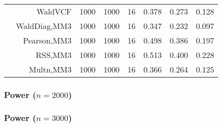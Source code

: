 \documentclass[
]{article}
\begin{document}
\begin{table}[H]
{\begin{tabular}[t]{lrrrrrrr}
\hspace{1em} & WaldVCF & 1000 & 1000 & 16 & 0.378 & 0.273 & 0.128\\

\hspace{1em} & WaldDiag,MM3 & 1000 & 1000 & 16 & 0.347 & 0.232 & 0.097\\

\hspace{1em} & Pearson,MM3 & 1000 & 1000 & 16 & 0.498 & 0.386 & 0.197\\

\hspace{1em} & RSS,MM3 & 1000 & 1000 & 16 & 0.513 & 0.400 & 0.228\\

\hspace{1em} & Multn,MM3 & 1000 & 1000 & 16 & 0.366 & 0.264 & 0.125\\
\bottomrule
\end{tabular}}
\endgroup{}
\end{table}

\hypertarget{power-n2000}{%
\subsubsection{\texorpdfstring{Power
(\(n=2000\))}{Power (n=2000)}}\label{power-n2000}}

\begin{table}[H]
\centering\begingroup\fontsize{7}{9}\selectfont

\endgroup{}
\end{table}

\hypertarget{power-n3000}{%
\subsubsection{\texorpdfstring{Power
(\(n=3000\))}{Power (n=3000)}}\label{power-n3000}}

\begin{table}[H]
\centering\begingroup\fontsize{7}{9}\selectfont

\endgroup{}
\end{table}
\end{document}
